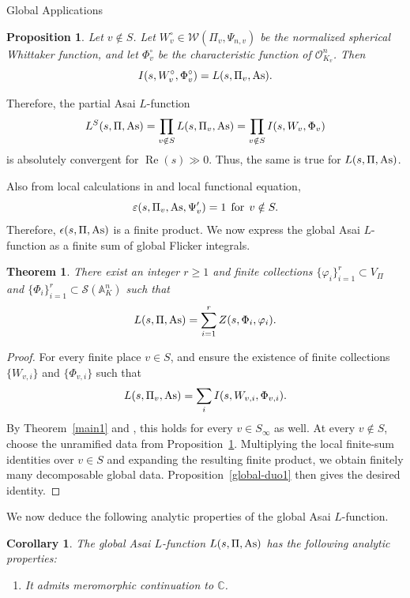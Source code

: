 \documentclass[12pt,reqno]{amsart}
\numberwithin{equation}{section}%
\numberwithin{equation}{subsection}
\newtheorem{thm}[equation]{Theorem}%
\newtheorem{prop}[equation]{Proposition}
\newtheorem{corollarySubsec}[equation]{Corollary}
\theoremstyle{definition}
\theoremstyle{remark}
\begin{document}
\begin{section}{Global Applications}
\begin{prop}\label{unramified1}
Let \(v\notin S\). Let
\(W_v^\circ\in\mathcal W(\Pi_v,\Psi_{n,v})\)
be the normalized spherical Whittaker function, and let
\(\Phi_v^\circ\) be the characteristic function of
\(\mathcal O_{K_v}^n\). Then
\[
I(s,W_v^\circ,\Phi_v^\circ)=L(s,\Pi_v,{\rm As}).
\]
\end{prop}

Therefore, the partial Asai $L$-function
\[L^{S}(s,\Pi,{\rm As})=\prod_{v\notin S} L(s,\Pi_v,{\rm As})=\prod_{v\notin S} I(s, W_v, \Phi_v)\]
is absolutely convergent for $\operatorname{Re}(s)\gg0$. Thus, the same is true for $L(s,\Pi,{\rm As})$.

Also from local calculations in \cite{Fli1993,Kab2004,JPSS1983, BP2021} and local functional equation, $$\varepsilon(s,\Pi_v,{\rm As},\Psi'_{v})=1\>\> \text{for}\>\>v\notin S.$$
Therefore, \(\epsilon(s,\Pi,{\rm As})\) is a finite product. We now express the global Asai \(L\)-function as a finite sum of global
Flicker integrals.

\begin{thm}\label{sum-global}
There exist an integer $r \geq 1$ and finite collections $\{\varphi_i\}_{i=1}^r \subset V_\Pi$ and $\{\Phi_i\}_{i=1}^r \subset \mathcal{S}(\mathbb{A}_K^n)$ such that
\[
  L(s, \Pi, {\rm As}) = \sum_{i=1}^r Z(s, \Phi_i, \varphi_i).
\]
\end{thm}

\begin{proof}
For every finite place $v \in S$, \cite[Theorem~5.3]{Mat2011} and \cite{JPSS1983} ensure the existence of finite collections $\{W_{v,i}\}$ and $\{\Phi_{v,i}\}$ such that
\[
  L(s, \Pi_v, {\rm As}) = \sum_i I(s, W_{v,i}, \Phi_{v,i}).
\]
By Theorem~\ref{main1} and \cite[Theorem~2.7]{Jac2009}, this holds for every $v \in S_\infty$ as well. At every \(v\notin S\), choose the unramified data from
Proposition~\ref{unramified1}. Multiplying the local finite-sum identities over
\(v\in S\) and expanding the resulting finite product, we obtain
finitely many decomposable global data. Proposition~\ref{global-duo1} then gives
the desired identity.
\end{proof}

We now deduce the following
analytic properties of the global Asai \(L\)-function.

\begin{corollarySubsec}
\label{global-asai-properties}
The global Asai \(L\)-function \(L(s,\Pi,{\rm As})\) has the following
analytic properties:
\begin{enumerate}
    \item It admits meromorphic continuation to \(\mathbb{C}\).


\end{enumerate}
\end{corollarySubsec}
\end{section}
\end{document}
